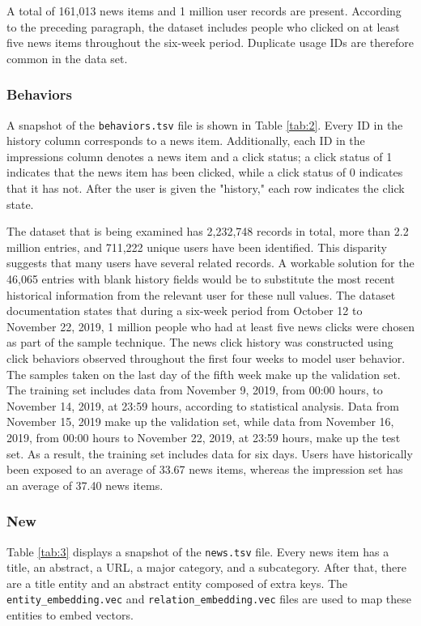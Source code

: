 \documentclass[9pt,twocolumn,twoside,lineno]{gsajnl}
\begin{document}
A total of 161,013 news items and 1 million user records are present. According to the preceding paragraph, the dataset includes people who clicked on at least five news items throughout the six-week period. Duplicate usage IDs are therefore common in the data set.

\subsubsection{Behaviors\newline}
A snapshot of the \texttt{behaviors.tsv} file is shown in Table \ref{tab:2}. Every ID in the history column corresponds to a news item. Additionally, each ID in the impressions column denotes a news item and a click status; a click status of 1 indicates that the news item has been clicked, while a click status of 0 indicates that it has not. After the user is given the "history," each row indicates the click state.


The dataset that is being examined has 2,232,748 records in total, more than 2.2 million entries, and 711,222 unique users have been identified. This disparity suggests that many users have several related records. A workable solution for the 46,065 entries with blank history fields would be to substitute the most recent historical information from the relevant user for these null values. The dataset documentation states that during a six-week period from October 12 to November 22, 2019, 1 million people who had at least five news clicks were chosen as part of the sample technique. The news click history was constructed using click behaviors observed throughout the first four weeks to model user behavior. The samples taken on the last day of the fifth week make up the validation set. The training set includes data from November 9, 2019, from 00:00 hours, to November 14, 2019, at 23:59 hours, according to statistical analysis. Data from November 15, 2019 make up the validation set, while data from November 16, 2019, from 00:00 hours to November 22, 2019, at 23:59 hours, make up the test set. As a result, the training set includes data for six days. Users have historically been exposed to an average of 33.67 news items, whereas the impression set has an average of 37.40 news items.

\subsubsection{New\newline}
Table \ref{tab:3} displays a snapshot of the \texttt{news.tsv} file. Every news item has a title, an abstract, a URL, a major category, and a subcategory. After that, there are a title entity and an abstract entity composed of extra keys. The \texttt{entity\_embedding.vec} and \texttt{relation\_embedding.vec} files are used to map these entities to embed vectors.
\end{document}
